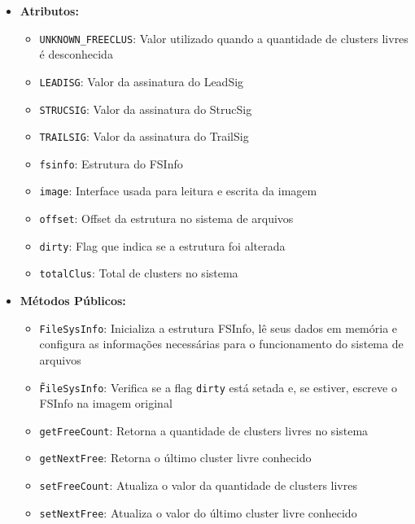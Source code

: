 \documentclass[
    12pt,				%
    oneside,   	        %
    a4paper,			%
    english,			%
    french,				%
    spanish,			%
    brazil,				%
    ]{pacotes/abntex2}
\begin{document}
\begin{itemize}
    \item \textbf{Atributos:}
        \begin{itemize}
            \item \texttt{UNKNOWN\_FREECLUS}: Valor utilizado quando a quantidade de clusters livres é desconhecida
            \item \texttt{LEADISG}: Valor da assinatura do LeadSig
            \item \texttt{STRUCSIG}: Valor da assinatura do StrucSig
            \item \texttt{TRAILSIG}: Valor da assinatura do TrailSig
            \item \texttt{fsinfo}: Estrutura do FSInfo
            \item \texttt{image}: Interface usada para leitura e escrita da imagem
            \item \texttt{offset}: Offset da estrutura no sistema de arquivos
            \item \texttt{dirty}: Flag que indica se a estrutura foi alterada
            \item \texttt{totalClus}: Total de clusters no sistema
        \end{itemize}
    \item \textbf{Métodos Públicos:}
        \begin{itemize}
            \item \texttt{FileSysInfo}: Inicializa a estrutura FSInfo, lê seus dados em memória e configura as informações necessárias para o funcionamento do sistema de arquivos
            \item \texttt{\~FileSysInfo}: Verifica se a flag \texttt{dirty} está setada e, se estiver, escreve o FSInfo na imagem original
            \item \texttt{getFreeCount}: Retorna a quantidade de clusters livres no sistema
            \item \texttt{getNextFree}: Retorna o último cluster livre conhecido
            \item \texttt{setFreeCount}: Atualiza o valor da quantidade de clusters livres
            \item \texttt{setNextFree}: Atualiza o valor do último cluster livre conhecido
        \end{itemize}
\end{itemize}
\end{document}
